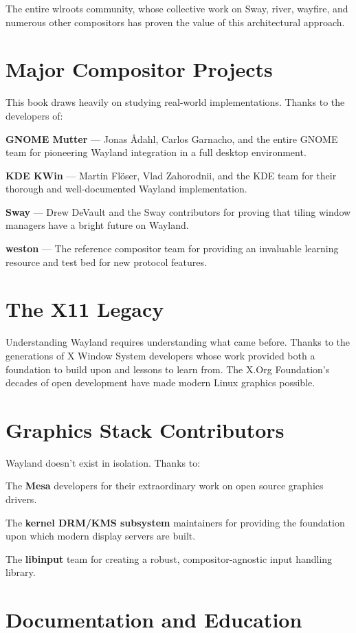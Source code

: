 The entire wlroots community, whose collective work on Sway, river, wayfire, and numerous other compositors has proven the value of this architectural approach.

\section*{Major Compositor Projects}

This book draws heavily on studying real-world implementations. Thanks to the developers of:

\textbf{GNOME Mutter} — Jonas Ådahl, Carlos Garnacho, and the entire GNOME team for pioneering Wayland integration in a full desktop environment.

\textbf{KDE KWin} — Martin Flöser, Vlad Zahorodnii, and the KDE team for their thorough and well-documented Wayland implementation.

\textbf{Sway} — Drew DeVault and the Sway contributors for proving that tiling window managers have a bright future on Wayland.

\textbf{weston} — The reference compositor team for providing an invaluable learning resource and test bed for new protocol features.

\section*{The X11 Legacy}

Understanding Wayland requires understanding what came before. Thanks to the generations of X Window System developers whose work provided both a foundation to build upon and lessons to learn from. The X.Org Foundation's decades of open development have made modern Linux graphics possible.

\section*{Graphics Stack Contributors}

Wayland doesn't exist in isolation. Thanks to:

The \textbf{Mesa} developers for their extraordinary work on open source graphics drivers.

The \textbf{kernel DRM/KMS subsystem} maintainers for providing the foundation upon which modern display servers are built.

The \textbf{libinput} team for creating a robust, compositor-agnostic input handling library.

\section*{Documentation and Education}

